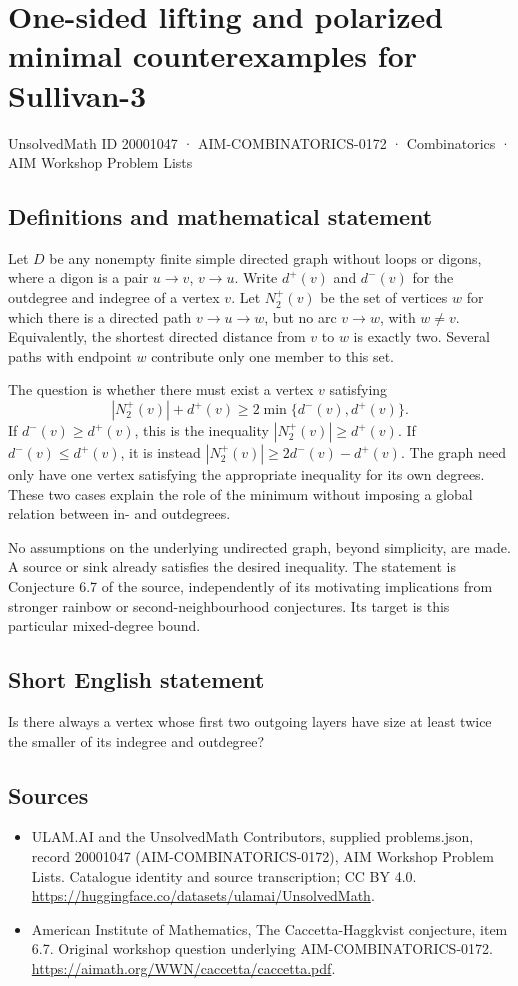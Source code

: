 \documentclass[11pt,a4paper]{article}
\begin{document}
\section*{One-sided lifting and polarized minimal counterexamples for Sullivan-3}\label{20001047}
{\small UnsolvedMath ID 20001047 · AIM-COMBINATORICS-0172 · Combinatorics · AIM Workshop Problem Lists}
\subsection{Definitions and mathematical statement}
Let $D$ be any nonempty finite simple directed graph without loops
or digons, where a digon is a pair $u\to v$, $v\to u$.
Write $d^+(v)$ and $d^-(v)$ for the outdegree and indegree of a
vertex $v$. Let $N_2^+(v)$ be the set of vertices $w$ for which
there is a directed path $v\to u\to w$, but no arc $v\to w$,
with $w\ne v$. Equivalently, the shortest directed distance from
$v$ to $w$ is exactly two. Several paths with endpoint $w$ contribute
only one member to this set.

The question is whether there must exist a vertex $v$ satisfying
\[
           |N_2^+(v)|+d^+(v)\ge2\min\{d^-(v),d^+(v)\}.
\]
If $d^-(v)\ge d^+(v)$, this is the inequality
$|N_2^+(v)|\ge d^+(v)$. If $d^-(v)\le d^+(v)$, it is instead
$|N_2^+(v)|\ge2d^-(v)-d^+(v)$. The graph need only have one
vertex satisfying the appropriate inequality for its own degrees.
These two cases explain the role of the minimum without imposing
a global relation between in- and outdegrees.

No assumptions on the underlying undirected graph, beyond simplicity,
are made. A source or sink already satisfies the desired inequality.
The statement is Conjecture 6.7 of the source, independently of its
motivating implications from stronger rainbow or second-neighbourhood
conjectures. Its target is this particular mixed-degree bound.
\subsection{Short English statement}
Is there always a vertex whose first two outgoing layers have size at least twice the smaller of its indegree and outdegree?
\subsection{Sources}
\begin{itemize}
\item[S1] ULAM.AI and the UnsolvedMath Contributors, supplied problems.json, record 20001047 (AIM-COMBINATORICS-0172), AIM Workshop Problem Lists. Catalogue identity and source transcription; CC BY 4.0.
\url{https://huggingface.co/datasets/ulamai/UnsolvedMath}.
\item[S2] American Institute of Mathematics, The Caccetta-Haggkvist conjecture, item 6.7. Original workshop question underlying AIM-COMBINATORICS-0172.
\url{https://aimath.org/WWN/caccetta/caccetta.pdf}.
\end{itemize}
\end{document}
